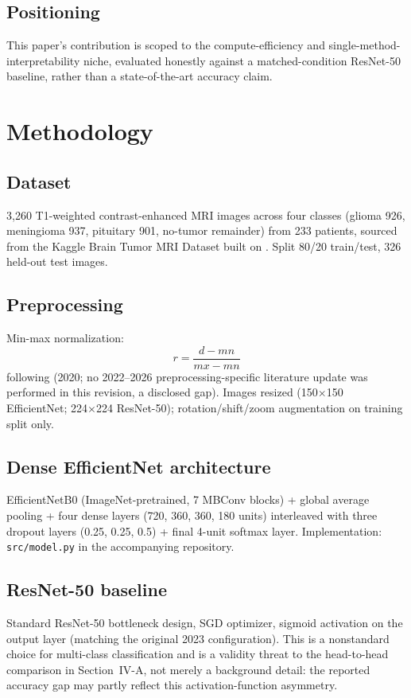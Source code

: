 \documentclass[journal]{IEEEtran}
\begin{document}
\subsection{Positioning}
This paper's contribution is scoped to the compute-efficiency and single-method-interpretability niche, evaluated honestly against a matched-condition ResNet-50 baseline, rather than a state-of-the-art accuracy claim.

\section{Methodology}

\subsection{Dataset}
3,260 T1-weighted contrast-enhanced MRI images across four classes (glioma 926, meningioma 937, pituitary 901, no-tumor remainder) from 233 patients, sourced from the Kaggle Brain Tumor MRI Dataset built on \cite{ref18}. Split 80/20 train/test, 326 held-out test images.

\subsection{Preprocessing}
Min-max normalization:
\begin{equation}
r = \frac{d - mn}{mx - mn}
\end{equation}
following \cite{ref19} (2020; no 2022--2026 preprocessing-specific literature update was performed in this revision, a disclosed gap). Images resized (150$\times$150 EfficientNet; 224$\times$224 ResNet-50); rotation/shift/zoom augmentation on training split only.

\subsection{Dense EfficientNet architecture}
EfficientNetB0 (ImageNet-pretrained, 7 MBConv blocks) + global average pooling + four dense layers (720, 360, 360, 180 units) interleaved with three dropout layers (0.25, 0.25, 0.5) + final 4-unit softmax layer. Implementation: \texttt{src/model.py} in the accompanying repository.

\subsection{ResNet-50 baseline}
Standard ResNet-50 \cite{ref20} bottleneck design, SGD optimizer, sigmoid activation on the output layer (matching the original 2023 configuration). This is a nonstandard choice for multi-class classification and is a validity threat to the head-to-head comparison in Section~IV-A, not merely a background detail: the reported accuracy gap may partly reflect this activation-function asymmetry.
\end{document}
